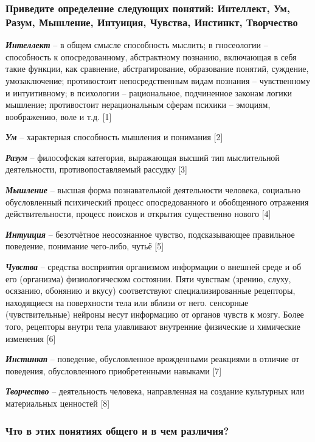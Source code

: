 \documentclass[14pt,a4paper,report]{report}
\begin{document}
\subsubsection{Приведите определение следующих понятий: Интеллект, Ум, Разум, Мышление, Интуиция, Чувства, Инстинкт, Творчество}

\emph{\textbf{Интеллект}} -- в общем смысле способность мыслить; в гносеологии – способность к опосредованному, абстрактному познанию, включающая в себя такие функции, как сравнение, абстрагирование, образование понятий, суждение, умозаключение; противостоит непосредственным видам познания – чувственному и интуитивному; в психологии – рациональное, подчиненное законам логики мышление; противостоит нерациональным сферам психики – эмоциям, воображению, воле и т.д. [1]

\emph{\textbf{Ум}} -- характерная способность мышления и понимания [2]

\emph{\textbf{Разум}} -- философская категория, выражающая высший тип мыслительной деятельности, противопоставляемый рассудку [3]

\emph{\textbf{Мышление}} -- высшая форма познавательной деятельности человека, социально обусловленный психический процесс опосредованного и обобщенного отражения действительности, процесс поисков и открытия существенно нового [4]

\emph{\textbf{Интуиция}} -- безотчётное неосознанное чувство, подсказывающее правильное поведение, понимание чего-либо, чутьё [5]

\emph{\textbf{Чувства}} -- средства восприятия организмом информации о внешней среде и об его (организма) физиологическом состоянии. Пяти чувствам (зрению, слуху, осязанию, обонянию и вкусу) соответствуют специализированные рецепторы, находящиеся на поверхности тела или вблизи от него. сенсорные (чувствительные) нейроны несут информацию от органов чувств к мозгу. Более того, рецепторы внутри тела улавливают внутренние физические и химические изменения [6] 


\emph{\textbf{Инстинкт}} -- поведение, обусловленное врожденными реакциями в отличие от поведения, обусловленного приобретенными навыками [7]


\emph{\textbf{Творчество}} -- деятельность человека, направленная на создание культурных или материальных ценностей [8]



\subsubsection{Что в этих понятиях общего и в чем различия?}
\end{document}
